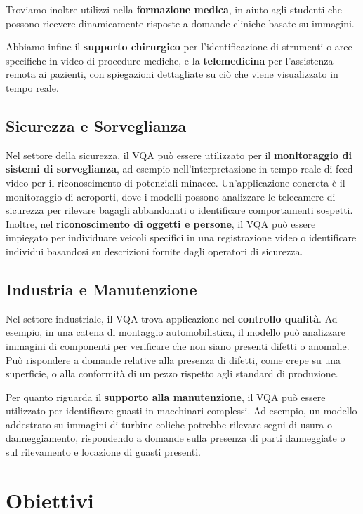 \documentclass[../main.tex]{subfiles}
\begin{document}
Troviamo inoltre utilizzi nella \textbf{formazione medica}, in aiuto agli studenti che possono ricevere dinamicamente risposte a domande cliniche basate su immagini.

Abbiamo infine il \textbf{supporto chirurgico} per l'identificazione di strumenti o aree specifiche in video di procedure mediche, e la \textbf{telemedicina} per l'assistenza remota ai pazienti, con spiegazioni dettagliate su ciò che viene visualizzato in tempo reale.

\subsection{Sicurezza e Sorveglianza}

Nel settore della sicurezza, il VQA può essere utilizzato per il \textbf{monitoraggio di sistemi di sorveglianza}, ad esempio nell'interpretazione in tempo reale di feed video per il riconoscimento di potenziali minacce. 
Un'applicazione concreta è il monitoraggio di aeroporti, dove i modelli possono analizzare le telecamere di sicurezza per rilevare bagagli abbandonati o identificare comportamenti sospetti.
Inoltre, nel \textbf{riconoscimento di oggetti e persone}, il VQA può essere impiegato per individuare veicoli specifici in una registrazione video o identificare individui basandosi su descrizioni fornite dagli operatori di sicurezza. 

\subsection{Industria e Manutenzione}

Nel settore industriale, il VQA trova applicazione nel \textbf{controllo qualità}. Ad esempio, in una catena di montaggio automobilistica, il modello può analizzare immagini di componenti per verificare che non siano presenti difetti o anomalie. 
Può rispondere a domande relative alla presenza di difetti, come crepe su una superficie, o alla conformità di un pezzo rispetto agli standard di produzione.

Per quanto riguarda il \textbf{supporto alla manutenzione}, il VQA può essere utilizzato per identificare guasti in macchinari complessi. Ad esempio, un modello addestrato su immagini di turbine eoliche potrebbe rilevare segni di usura o danneggiamento, rispondendo a domande sulla presenza di parti danneggiate o sul rilevamento e locazione di guasti presenti.

\section{Obiettivi}
\end{document}
